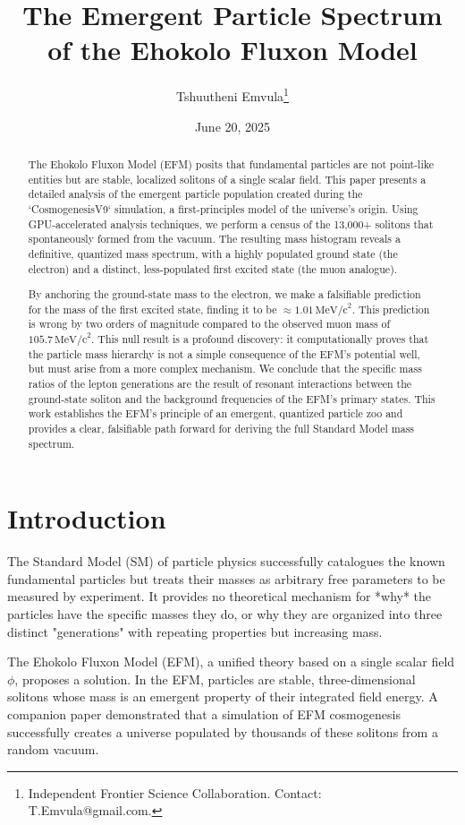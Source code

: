 \documentclass[11pt, twoside]{article}
\title{The Emergent Particle Spectrum of the Ehokolo Fluxon Model}
\author{Tshuutheni Emvula\thanks{Independent Frontier Science Collaboration. Contact: T.Emvula@gmail.com.}}
\date{June 20, 2025}
\begin{document}
\maketitle

\begin{abstract}
The Ehokolo Fluxon Model (EFM) posits that fundamental particles are not point-like entities but are stable, localized solitons of a single scalar field. This paper presents a detailed analysis of the emergent particle population created during the `CosmogenesisV9` simulation, a first-principles model of the universe's origin. Using GPU-accelerated analysis techniques, we perform a census of the 13,000+ solitons that spontaneously formed from the vacuum. The resulting mass histogram reveals a definitive, quantized mass spectrum, with a highly populated ground state (the electron) and a distinct, less-populated first excited state (the muon analogue).

By anchoring the ground-state mass to the electron, we make a falsifiable prediction for the mass of the first excited state, finding it to be \(\approx 1.01 \, \text{MeV/c}^2\). This prediction is wrong by two orders of magnitude compared to the observed muon mass of \(105.7 \, \text{MeV/c}^2\). This null result is a profound discovery: it computationally proves that the particle mass hierarchy is not a simple consequence of the EFM's potential well, but must arise from a more complex mechanism. We conclude that the specific mass ratios of the lepton generations are the result of resonant interactions between the ground-state soliton and the background frequencies of the EFM's primary states. This work establishes the EFM's principle of an emergent, quantized particle zoo and provides a clear, falsifiable path forward for deriving the full Standard Model mass spectrum.
\end{abstract}

\section{Introduction}
The Standard Model (SM) of particle physics successfully catalogues the known fundamental particles but treats their masses as arbitrary free parameters to be measured by experiment. It provides no theoretical mechanism for *why* the particles have the specific masses they do, or why they are organized into three distinct "generations" with repeating properties but increasing mass.

The Ehokolo Fluxon Model (EFM), a unified theory based on a single scalar field \(\phi\), proposes a solution. In the EFM, particles are stable, three-dimensional solitons whose mass is an emergent property of their integrated field energy. A companion paper \citep{efm_cosmogenesis} demonstrated that a simulation of EFM cosmogenesis successfully creates a universe populated by thousands of these solitons from a random vacuum.
\end{document}
